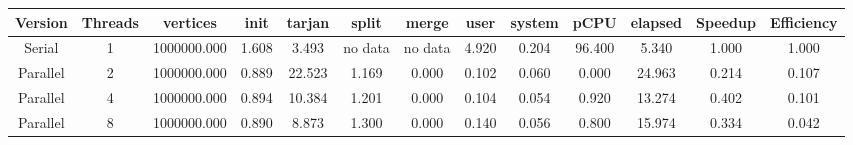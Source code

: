 \begin{tabular}{|c|c|c|c|c|c|c|c|c|c|c|c|c|}
\toprule
 Version &  Threads &    vertices &  init &  tarjan &   split &   merge &  user &  system &   pCPU &  elapsed &  Speedup &  Efficiency \\
\midrule
  Serial &        1 & 1000000.000 & 1.608 &   3.493 & no data & no data & 4.920 &   0.204 & 96.400 &    5.340 &    1.000 &       1.000 \\
Parallel &        2 & 1000000.000 & 0.889 &  22.523 &   1.169 &   0.000 & 0.102 &   0.060 &  0.000 &   24.963 &    0.214 &       0.107 \\
Parallel &        4 & 1000000.000 & 0.894 &  10.384 &   1.201 &   0.000 & 0.104 &   0.054 &  0.920 &   13.274 &    0.402 &       0.101 \\
Parallel &        8 & 1000000.000 & 0.890 &   8.873 &   1.300 &   0.000 & 0.140 &   0.056 &  0.800 &   15.974 &    0.334 &       0.042 \\
\bottomrule
\end{tabular}
